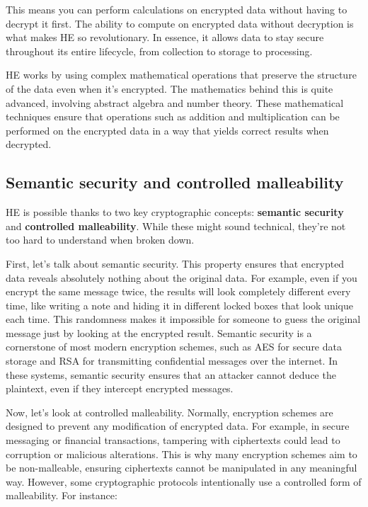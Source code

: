\documentclass[
  letterpaper,
  DIV=11,
  numbers=noendperiod,
  oneside]{scrartcl}
\begin{document}
This means you can perform calculations on encrypted data without having
to decrypt it first. The ability to compute on encrypted data without
decryption is what makes HE so revolutionary. In essence, it allows data
to stay secure throughout its entire lifecycle, from collection to
storage to processing.

HE works by using complex mathematical operations that preserve the
structure of the data even when it's encrypted. The mathematics behind
this is quite advanced, involving abstract algebra and number theory.
These mathematical techniques ensure that operations such as addition
and multiplication can be performed on the encrypted data in a way that
yields correct results when decrypted.

\subsection{Semantic security and controlled
malleability}\label{semantic-security-and-controlled-malleability}

HE is possible thanks to two key cryptographic concepts:
\textbf{semantic security} and \textbf{controlled malleability}. While
these might sound technical, they're not too hard to understand when
broken down.

First, let's talk about semantic security. This property ensures that
encrypted data reveals absolutely nothing about the original data. For
example, even if you encrypt the same message twice, the results will
look completely different every time, like writing a note and hiding it
in different locked boxes that look unique each time. This randomness
makes it impossible for someone to guess the original message just by
looking at the encrypted result. Semantic security is a cornerstone of
most modern encryption schemes, such as AES for secure data storage and
RSA for transmitting confidential messages over the internet. In these
systems, semantic security ensures that an attacker cannot deduce the
plaintext, even if they intercept encrypted messages.

Now, let's look at controlled malleability. Normally, encryption schemes
are designed to prevent any modification of encrypted data. For example,
in secure messaging or financial transactions, tampering with
ciphertexts could lead to corruption or malicious alterations. This is
why many encryption schemes aim to be non-malleable, ensuring
ciphertexts cannot be manipulated in any meaningful way. However, some
cryptographic protocols intentionally use a controlled form of
malleability. For instance:
\end{document}
